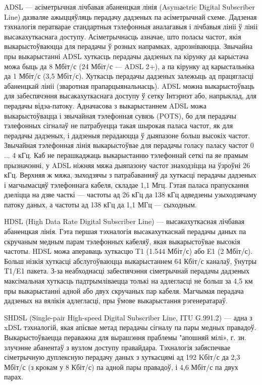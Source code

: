 ADSL --- асіметрычная лічбавая абаненцкая лінія (Asymаetric Digital Subscriber Line) дазваляе ажыццяўляць перадачу дадзеных па асіметрычнай схеме. Дадзеная тэхналогія ператварае стандартныя тэлефонныя аналагавыя і лічбавыя лініі ў лініі высакахуткаснага доступу. Асіметрычнасць азначае, што поласы частот, якія выкарыстоўваюцца для перадачы ў розных напрамках, адрозніваюцца. Звычайна пры выкарыстанні ADSL хуткасць перадачы дадзеных па кірунку да карыстача можа быць да 8 Мбіт/с (24 Мбіт/с --- ADSL 2+), а па кірунку ад карыстальніка да 1 Мбіт/с (3,5 Мбіт/с). Хуткасць перадачы дадзеных залежыць ад працягласці абаненцкай лініі (зваротная прапарцыянальнасць). ADSL можна выкарыстоўваць для забеспячэння высакахуткаснага доступу ў сетку Інтэрнэт або, напрыклад, для перадачы відэа-патоку. Адначасова з выкарыстаннем ADSL можа выкарыстоўвацца і звычайная тэлефонная сувязь (POTS), бо для перадачы тэлефонных сігналаў не патрабуецца такая шырокая паласа частот, як для перадачы дадзеных, і дадзеныя перадаюцца ў дыяпазоне больш высокіх частот. Звычайная тэлефонная лінія выкарыстоўвае для перадачы голасу паласу частот 0 ... 4 кГц. Каб не перашкаджаць выкарыстанню тэлефоннай сеткі па яе прамым прызначэнні, у ADSL ніжняя мяжа дыяпазону частот знаходзіцца на ўзроўні 26 кГц. Верхняя ж мяжа, зыходзячы з патрабаванняў да хуткасці перадачы дадзеных і магчымасцяў тэлефоннага кабеля, складае 1,1 Мгц. Гэтая паласа прапускання дзеліцца на дзве часткі --- частоты ад 26 кГц да 138 кГц адведзены узыходзячаму патоку даных, а частоты ад 138 кГц да 1,1 МГц --- сыходным.

HDSL (High Data Rate Digital Subscriber Line) --- высакахуткасная лічбавая абаненцкая лінія. Гэта першая тэхналогія высакахуткаснай перадачы даных па скручаным медным парам тэлефонных кабеляў, якая выкарыстоўвае высокія частоты. HDSL можа апераваць хуткасцю T1 (1.544 Мбіт/с) або E1 (2 Мбіт/с). Больш нізкія хуткасці абслугоўваюцца выкарыстаннем 64 Кбіт/с каналаў, ўнутры T1/E1 пакета. З-за неабходнасці забеспячэння сіметрычнай перадачы дадзеных максімальная хуткасць падтрымліваецца толькі на адлегласці не больш за 4,5 км пры выкарыстанні адной або двух скручаных пар кабеля. Магчымая перадача дадзеных на вялікія адлегласці, пры ўмове выкарыстання рэгенератараў.

SHDSL (Single-pair High-speed Digital Subscriber Line, ITU G.991.2) --- адна з xDSL тэхналогій, якая апісвае метад перадачы сігналу па пары медных правадоў. Выкарыстоўваецца пераважна для вырашэння праблемы "апошняй мілі», г. зн. злучэнне абанентаў з вузлом доступу правайдара. Тэхналогія забяспечвае сіметрычную дуплексную перадачу даных з хуткасцямі ад 192 Kбіт/с да 2,3 Мбіт/с (з крокам у 8 Кбіт/с) па адной пары правадоў, і 4,6 Мбіт/с па двух парах.

